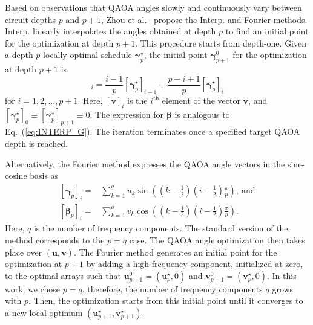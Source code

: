 \documentclass[twocolumn,
english,
aps,
pra,
10pt,
longbibliography,
superscriptaddress,
amsmath,
amssymb,
floatfix
]{revtex4-2}
\begin{document}
{Based on observations that QAOA angles slowly and continuously vary between circuit depths $p$ and $p+1$, Zhou et al.~\cite{Zhou2020} propose the Interp. and Fourier methods.
Interp. linearly interpolates the angles obtained at depth $p$ to find an initial point for the optimization at depth $p+1$. 
This procedure starts from depth-one.
Given a depth-$p$ locally optimal schedule $\boldsymbol{\gamma}^\star_p$, the initial point  $\boldsymbol{\gamma}^0_{p+1}$ for the optimization at depth $p+1$ is
\begin{equation}
[\boldsymbol\gamma^0_{p+1}]_i = \frac{i-1}{p}[\boldsymbol\gamma^\star_{p}]_{i-1} + \frac{p-i+1}{p}[\boldsymbol\gamma^\star_{p}]_{i}
\label{eq:INTERP_G}
\end{equation}
for $i=1, 2,...,p+1$. 
Here, $[\boldsymbol
v]_i$ is the $i^\text{th}$ element of the vector $\boldsymbol v$, and $[\boldsymbol\gamma^\star_{p}]_0\equiv [\boldsymbol\gamma^\star_{p}]_{p+1}\equiv 0$. 
The expression for $\boldsymbol\beta$ is analogous to Eq.~(\ref{eq:INTERP_G}). 
The iteration terminates once a specified target QAOA depth is reached.

Alternatively, the Fourier method expresses the QAOA angle vectors in the sine-cosine basis as
\begin{align}
\left[\boldsymbol\gamma_p\right]_i =& \sum_{k=1}^q u_k\sin\left(\left(k-\frac{1}{2}\right)\left(i-\frac{1}{2}\right)\frac{\pi}{p}\right),~\text{and} \\
\left[\boldsymbol\beta_p\right]_i =& \sum_{k=1}^q v_k\cos\left(\left(k-\frac{1}{2}\right)\left(i-\frac{1}{2}\right)\frac{\pi}{p}\right).
\end{align}
Here, $q$ is the number of frequency components.
The standard version of the method corresponds to the $p=q$ case.
The QAOA angle optimization then takes place over $(\boldsymbol{u}, \boldsymbol{v})$.
The Fourier method generates an initial point for the optimization at $p+1$ by adding a high-frequency component, initialized at zero, to the optimal arrays such that $\boldsymbol{u}^0_{p+1} = (\boldsymbol u^\star_p,0)$ and $\boldsymbol{v}^0_{p+1} = (\boldsymbol v^\star_p,0)$. 
In this work, we chose $p=q$, therefore, the number of frequency components $q$ grows with $p$.
Then, the optimization starts from this initial point until it converges to a new local optimum $(\boldsymbol u^\star_{p+1},\boldsymbol v^\star_{p+1})$.


}
\end{document}
